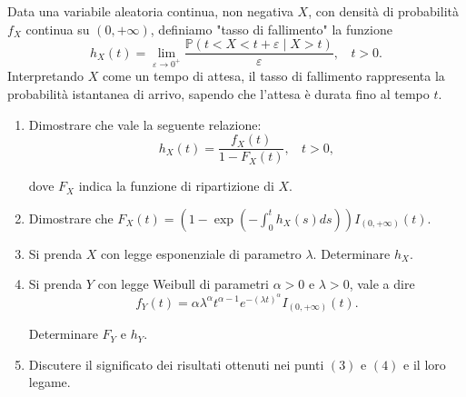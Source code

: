 Data una variabile aleatoria continua, non negativa $X$, con densità di probabilità $f_{X}$ continua su $\left( 0,+\infty \right)$, definiamo "tasso di fallimento" la funzione
\begin{equation*}
h_{X}( t) =\lim _{\varepsilon \rightarrow 0^{+}}\frac{\mathbb{P}( t< X< t+\varepsilon \mid X >t)}{\varepsilon } ,\ \ \ \ t >0.
\end{equation*}
Interpretando $X$ come un tempo di attesa, il tasso di fallimento rappresenta la probabilità istantanea di arrivo, sapendo che l'attesa è durata fino al tempo $t$.
\begin{enumerate}
\item Dimostrare che vale la seguente relazione:\begin{equation*}
h_{X}( t) =\frac{f_{X}( t)}{1-F_{X}( t)} ,\ \ \ \ t >0,
\end{equation*}

dove $F_{X}$ indica la funzione di ripartizione di $X$.
\item Dimostrare che $F_{X}( t) =\left( 1-\exp\left( -\int _{0}^{t} h_{X}( s) ds\right)\right) I_{( 0,+\infty )}( t)$.
\item Si prenda $X$ con legge esponenziale di parametro $\lambda $. Determinare $h_{X}$.
\item Si prenda $Y$ con legge Weibull di parametri $\alpha  >0$ e $\lambda  >0$, vale a dire\begin{equation*}
f_{Y}( t) =\alpha \lambda ^{\alpha } t^{\alpha -1} e^{-( \lambda t)^{\alpha }} I_{( 0,+\infty )}( t) .
\end{equation*}

Determinare $F_{Y}$ e $h_{Y}$.
\item Discutere il significato dei risultati ottenuti nei punti $( 3)$ e $( 4)$ e il loro legame.
\end{enumerate}
\Esercizio{}

